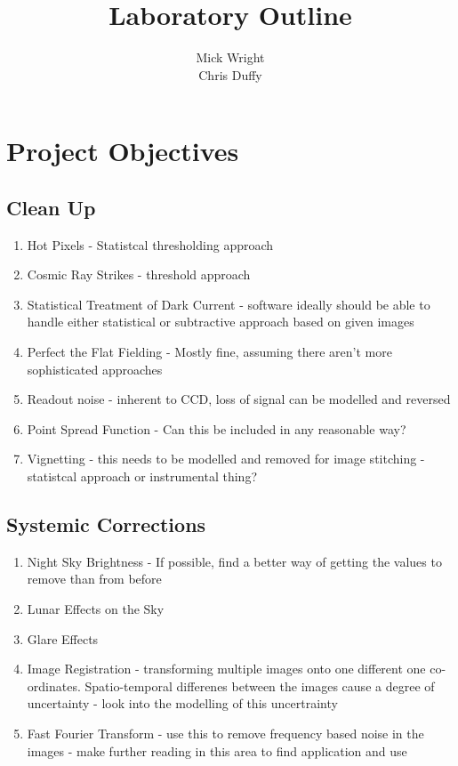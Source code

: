\documentclass{article}
\title{\textbf{Laboratory Outline}}
\author{Mick Wright\\Chris Duffy}
\date{}
\begin{document}
\maketitle

\section{Project Objectives}
\subsection{Clean Up}
\begin{enumerate}
\item{Hot Pixels - Statistcal thresholding approach}
\item{Cosmic Ray Strikes - threshold approach}
\item{Statistical Treatment of Dark Current - software ideally should be able to handle either statistical or subtractive approach based on given images}
\item{Perfect the Flat Fielding - Mostly fine, assuming there aren't more sophisticated approaches}
\item{Readout noise - inherent to CCD, loss of signal can be modelled and reversed}
\item{Point Spread Function - Can this be included in any reasonable way?} 
\item{Vignetting - this needs to be modelled and removed for image stitching - statistcal approach or instrumental thing?}
\end{enumerate}

\subsection{Systemic Corrections}
\begin{enumerate}
\item{Night Sky Brightness - If possible, find a better way of getting the values to remove than from before}
\item{Lunar Effects on the Sky}
\item{Glare Effects}
\item{Image Registration - transforming multiple images onto one different one co-ordinates. Spatio-temporal differenes between the images cause a degree of uncertainty - look into the modelling of this uncertrainty}
\item{Fast Fourier Transform - use this to remove frequency based noise in the images - make further reading in this area to find application and use} 
\end{enumerate}
\end{document}
